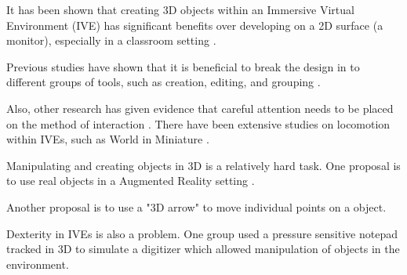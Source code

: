 It has been shown that creating 3D objects within an Immersive Virtual
Environment (IVE) has significant benefits over developing on a 2D surface (a
monitor)\cite{Kaufmann:Usability}, especially in a classroom setting
\cite{Kaufmann:LearningGeometry}.

Previous studies have shown that it is beneficial to break the design in to
different groups of tools, such as creation, editing, and grouping
\cite{Butterworth:1992:3DM}.

Also, other research has given evidence that careful attention needs to be
placed on the method of interaction \cite{Bowman98interactiontechniques}.
There have been extensive studies on locomotion within IVEs, such as World in
Miniature \cite{Pausch:WorldInMiniature}.

Manipulating and creating objects in 3D is a relatively hard task\cite{Mine:MovingObjects}.  One
proposal is to use real objects in a Augmented Reality setting
\cite{Jota:2011:CVM:1979742.1979915}.

Another proposal is to use a "3D arrow" to move individual points on a object\cite{5759472}.

Dexterity in IVEs is also a problem.  One group used a pressure sensitive 
notepad tracked in 3D to simulate a digitizer which allowed manipulation of
objects in the environment\cite{658467}.

